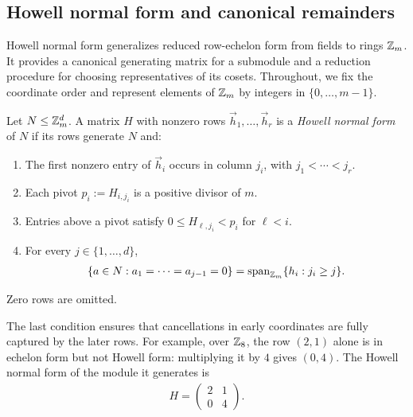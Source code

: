 \subsection{Howell normal form and canonical remainders}
\label{app:howell}

Howell normal form generalizes reduced row-echelon form
from fields to rings $\mathbb{Z}_m$. It provides a canonical
generating matrix for a submodule and a reduction
procedure for choosing representatives of its cosets.
Throughout, we fix the coordinate order and represent
elements of $\mathbb{Z}_m$ by integers in $\{0,\ldots,m-1\}$.

\begin{definition}
    Let $N\leq\mathbb{Z}_m^d$. A matrix $H$ with nonzero rows
    $\vec{h}_1,\ldots,\vec{h}_r$ is a \emph{Howell
    normal form} of $N$ if its rows generate $N$ and:
    \begin{enumerate}
        \item The first nonzero entry of $\vec{h}_i$
        occurs in column $j_i$, with
        $j_1<\cdots<j_r$.

        \item Each pivot $p_i:=H_{i,j_i}$ is a positive
        divisor of $m$.

        \item Entries above a pivot satisfy
        $0\leq H_{\ell,j_i}<p_i$ for $\ell<i$.

        \item For every $j\in\{1,\ldots,d\}$,
        \begin{align}
            \{\vec{a}\in N:
              a_1=\cdots=a_{j-1}=0\}
            =
            \operatorname{span}_{\Z_m}
            \{\vec{h}_i:j_i\geq j\}.
            \label{eq:howell-tail}
        \end{align}
    \end{enumerate}
    Zero rows are omitted.
\end{definition}

The last condition ensures that cancellations in early
coordinates are fully captured by the later rows.
For example, over $\mathbb{Z}_8$, the row $(2,1)$ alone is
in echelon form but not Howell form: multiplying it
by $4$ gives $(0,4)$. The Howell normal form of the
module it generates is
\begin{align}
    H=
    \begin{pmatrix}
        2 & 1\\
        0 & 4
    \end{pmatrix}.
\end{align}

